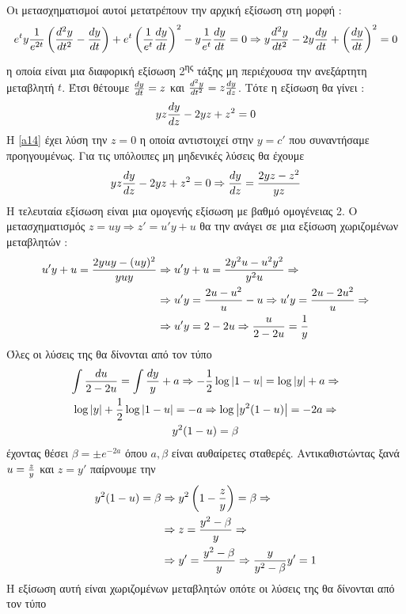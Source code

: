 \documentclass[a4paper,twoside,11pt]{book}
\DeclareRobustCommand{\frac}[3][0pt]{%
{\begingroup\hspace{#1}#2\hspace{#1}\endgroup\over\hspace{#1}#3\hspace{#1}}}
\newcommand{\tss}[1]{\textsuperscript{#1}}
\begin{document}
Οι μετασχηματισμοί αυτοί μετατρέπουν την αρχική εξίσωση στη μορφή :
\begin{gather*}
e^ty\frac{1}{e^{2t}}\left( \frac{d^2y}{dt^2}-\frac{dy}{dt}\right)+e^t\left( \frac{1}{e^t}\frac{dy}{dt}\right)^2-y\frac{1}{e^t}\frac{dy}{dt}=0\Rightarrow
y\frac{d^2y}{dt^2}-2y\frac{dy}{dt}+\left( \frac{dy}{dt}\right)^2=0
\end{gather*}
η οποία είναι μια διαφορική εξίσωση 2\tss{ης} τάξης μη περιέχουσα την ανεξάρτητη μεταβλητή $ t $. Έτσι θέτουμε $ \frac{dy}{dt}=z $ και $ \frac{d^2y}{dt^2}=z\frac{dy}{dz} $. Τότε η εξίσωση θα γίνει :
\begin{equation}\label{a14}
yz\frac{dy}{dz}-2yz+z^2=0
\end{equation}
Η \eqref{a14} έχει λύση την $ z=0 $ η οποία αντιστοιχεί στην $ y=c' $ που συναντήσαμε προηγουμένως. Για τις υπόλοιπες μη μηδενικές λύσεις θα έχουμε
\[ yz\frac{dy}{dz}-2yz+z^2=0\Rightarrow \frac{dy}{dz}=\frac{2yz-z^2}{yz} \]
Η τελευταία εξίσωση είναι μια ομογενής εξίσωση με βαθμό ομογένειας 2. Ο μετασχηματισμός $ z=uy\Rightarrow z'=u'y+u $ θα την ανάγει σε μια εξίσωση χωριζομένων μεταβλητών :
\begin{align*}
u'y+u=\frac{2yuy-(uy)^2}{yuy}&\Rightarrow u'y+u=\frac{2y^2u-u^2y^2}{y^2u}\Rightarrow\\
&\Rightarrow u'y=\frac{2u-u^2}{u}-u\Rightarrow u'y=\frac{2u-2u^2}{u}\Rightarrow\\
&\Rightarrow u'y=2-2u\Rightarrow \dfrac{u}{2-2u}=\frac{1}{y}
\end{align*}
Όλες οι λύσεις της θα δίνονται από τον τύπο
\begin{gather*}
\int\dfrac{du}{2-2u}=\int\frac{dy}{y}+a\Rightarrow -\dfrac{1}{2}\log|1-u|=\log|y|+a\Rightarrow\\
\log|y|+\dfrac{1}{2}\log|1-u|=-a\Rightarrow \log\left|y^2(1-u) \right|=-2a \Rightarrow\\
y^2(1-u)=\beta
\end{gather*}
έχοντας θέσει $ \beta=\pm e^{-2a} $ όπου $ a,\beta $ είναι αυθαίρετες σταθερές. Αντικαθιστώντας ξανά $ u=\frac{z}{y} $ και $ z=y' $ παίρνουμε την 
\begin{align*} y^2(1-u)=\beta&\Rightarrow y^2\left( 1-\frac{z}{y}\right) =\beta\Rightarrow\\ &\Rightarrow z=\frac{y^2-\beta}{y}\Rightarrow\\ &\Rightarrow y'=\frac{y^2-\beta}{y}\Rightarrow
\frac{y}{y^2-\beta}y'=1
\end{align*}
Η εξίσωση αυτή είναι χωριζομένων μεταβλητών οπότε οι λύσεις της θα δίνονται από τον τύπο
\end{document}
